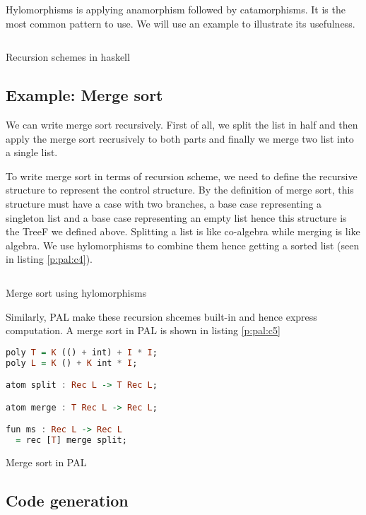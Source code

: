 Hylomorphisms is applying anamorphism followed by catamorphisms. It is the most common pattern to use. We will use an example to illustrate its usefulness. 
\begin{listing}[ht]
\inputminted{haskell}{project/pal-rs.hs}
\caption{Recursion schemes in haskell} \label{p:pal:c3}
\end{listing}
\subsection{Example: Merge sort}
We can write merge sort recursively. First of all, we split the list in half and then apply the merge sort recrusively to both parts and finally we merge two list into a single list. 

To write merge sort in terms of recursion scheme, we need to define the recursive structure to represent the control structure. By the definition of merge sort, this structure must have a case with two branches, a base case representing a singleton list and a base case representing an empty list hence this structure is the TreeF we defined above. Splitting a list is like co-algebra while merging is like algebra. We use hylomorphisms to combine them hence getting a sorted list (seen in listing \ref{p:pal:c4}).
\begin{listing}[ht]
\inputminted{haskell}{project/pal-ms.hs}
\caption{Merge sort using hylomorphisms} \label{p:pal:c4}
\end{listing}

Similarly, PAL make these recursion shcemes built-in and hence express computation. A merge sort in PAL is shown in listing \ref{p:pal:c5}
\begin{listing}[ht]
\begin{lstlisting}[language=haskell]
poly T = K (() + int) + I * I;
poly L = K () + K int * I;

atom split : Rec L -> T Rec L;

atom merge : T Rec L -> Rec L;

fun ms : Rec L -> Rec L
  = rec [T] merge split;
\end{lstlisting}
\caption{Merge sort in PAL} \label{p:pal:c5}
\end{listing}
\subsection{Code generation}